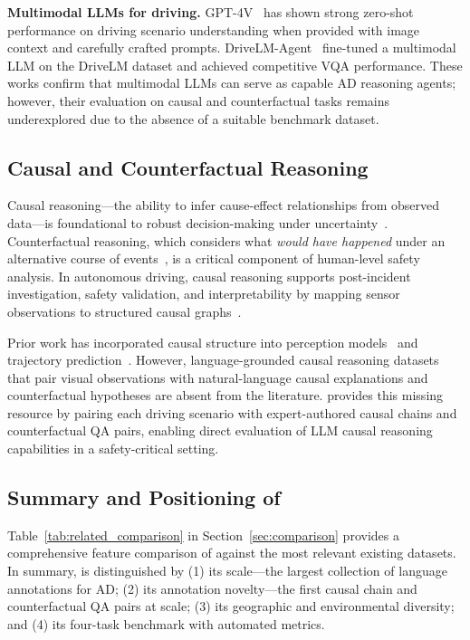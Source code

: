 \textbf{Multimodal LLMs for driving.} GPT-4V~\cite{openai2023gpt4} has shown
strong zero-shot performance on driving scenario understanding when provided with
image context and carefully crafted prompts. DriveLM-Agent~\cite{sima2023drivelm}
fine-tuned a multimodal LLM on the DriveLM dataset and achieved competitive
VQA performance. These works confirm that multimodal LLMs can serve as capable
AD reasoning agents; however, their evaluation on causal and counterfactual tasks
remains underexplored due to the absence of a suitable benchmark dataset.

\subsection{Causal and Counterfactual Reasoning}
\label{ssec:rw_causal}

Causal reasoning---the ability to infer cause-effect relationships from observed
data---is foundational to robust decision-making under uncertainty~\cite{pearl2009causality}.
Counterfactual reasoning, which considers what \emph{would have happened} under
an alternative course of events~\cite{lewis1973counterfactuals}, is a critical
component of human-level safety analysis. In autonomous driving, causal reasoning
supports post-incident investigation, safety validation, and interpretability by
mapping sensor observations to structured causal graphs~\cite{scholkopf2021toward}.

Prior work has incorporated causal structure into perception models~\cite{ding2023dima}
and trajectory prediction~\cite{yuan2021agent}. However, language-grounded causal
reasoning datasets that pair visual observations with natural-language causal
explanations and counterfactual hypotheses are absent from the literature.
\lucid{} provides this missing resource by pairing each driving scenario
with expert-authored causal chains and counterfactual QA pairs, enabling
direct evaluation of LLM causal reasoning capabilities in a safety-critical setting.

\subsection{Summary and Positioning of \lucid{}}
\label{ssec:rw_summary}

Table~\ref{tab:related_comparison} in Section~\ref{sec:comparison} provides a
comprehensive feature comparison of \lucid{} against the most relevant existing
datasets. In summary, \lucid{} is distinguished by (1) its scale---the largest
collection of language annotations for AD; (2) its annotation novelty---the first
causal chain and counterfactual QA pairs at scale; (3) its geographic and
environmental diversity; and (4) its four-task benchmark with automated metrics.
